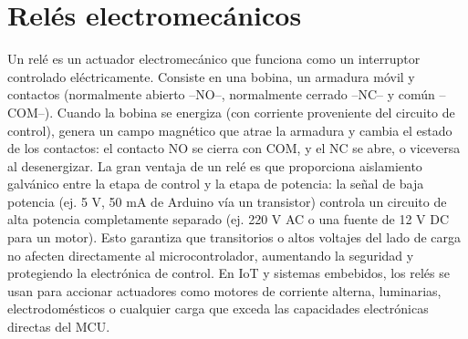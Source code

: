 \section{Relés electromecánicos}
Un relé es un actuador electromecánico que funciona como un interruptor controlado eléctricamente. Consiste en una bobina, un armadura móvil y contactos (normalmente abierto –NO–, normalmente cerrado –NC– y común –COM–). Cuando la bobina se energiza (con corriente proveniente del circuito de control), genera un campo magnético que atrae la armadura y cambia el estado de los contactos: el contacto NO se cierra con COM, y el NC se abre, o viceversa al desenergizar. La gran ventaja de un relé es que proporciona aislamiento galvánico entre la etapa de control y la etapa de potencia: la señal de baja potencia (ej. 5 V, 50 mA de Arduino vía un transistor) controla un circuito de alta potencia completamente separado (ej. 220 V AC o una fuente de 12 V DC para un motor)\cite{Smoot2023Reles}. Esto garantiza que transitorios o altos voltajes del lado de carga no afecten directamente al microcontrolador, aumentando la seguridad y protegiendo la electrónica de control. En IoT y sistemas embebidos, los relés se usan para accionar actuadores como motores de corriente alterna, luminarias, electrodomésticos o cualquier carga que exceda las capacidades electrónicas directas del MCU. 
\\\\
